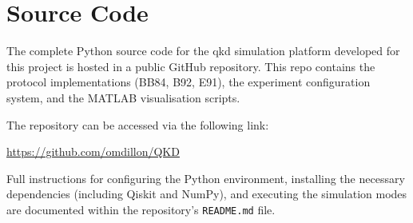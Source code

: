 \documentclass[11pt, a4paper]{report}
\renewcommand{\footnotesize}{\fontsize{9}{10}\selectfont}
\begin{document}
\clearpage
{\footnotesize


}

\appendix
\chapter{Source Code}
\label{app:source_code}

The complete Python source code for the \gls{qkd} simulation platform developed for this project is hosted in a public GitHub repository. This repo contains the protocol implementations (BB84, B92, E91), the experiment configuration system, and the MATLAB visualisation scripts. 

The repository can be accessed via the following link:

\vspace{0.5cm}
\begin{center}
    \url{https://github.com/omdillon/QKD}
\end{center}
\vspace{0.5cm}

Full instructions for configuring the Python environment, installing the necessary dependencies (including Qiskit and NumPy), and executing the simulation modes are documented within the repository's \texttt{README.md} file.
\end{document}
